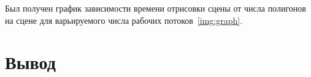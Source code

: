 Был получен график зависимости времени отрисовки сцены от числа полигонов на сцене для варьируемого числа рабочих потоков~\ref{img:graph}.




\section{Вывод}


\clearpage
